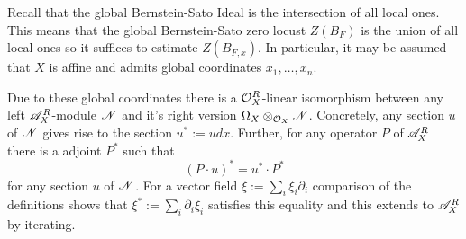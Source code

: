 \noindent
Recall that the global Bernstein-Sato Ideal is the intersection of all local ones.
This means that the global Bernstein-Sato zero locust $Z(B_F)$ is the union of all local ones so it suffices to estimate $Z(B_{F,x})$.
In particular, it may be assumed that $X$ is affine and admits global coordinates $x_1,\ldots,x_n$.

Due to these global coordinates there is a $\mathcal{O}_X^R$-linear isomorphism between any left $\mathscr{A}_X^R$-module $\mathscr{N}$ and it's right version $\Omega_X \otimes_{\mathcal{O}_X}\mathscr{N}$. Concretely, any section $u$ of $\mathscr{N}$ gives rise to the section $u^* := u dx$. Further, for any operator $P$ of $\mathscr{A}_X^R$ there is a adjoint $P^*$ such that
$$(P\cdot u)^* =   u^* \cdot P^*$$
for any section $u$ of $\mathscr{N}$. For a vector field $\xi := \sum_i\xi_i \partial_i$ comparison of the definitions shows that $\xi^* := \sum_i\partial_i\xi_i$ satisfies this equality and this extends to $\mathscr{A}_X^R$ by iterating.

